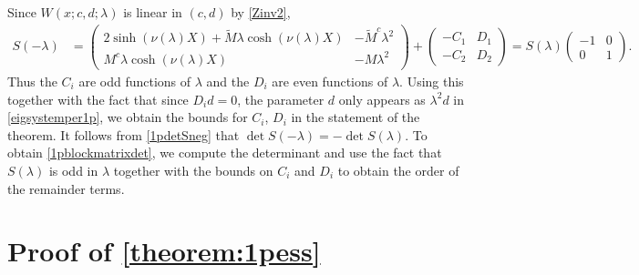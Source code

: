 \documentclass[thesis.tex]{subfiles}
\begin{document}
Since $W(x; c, d; \lambda)$ is linear in $(c, d)$ by \cref{Zinv2}, 
\begin{align}\label{1pdetSneg}
S(-\lambda) &= 
\begin{pmatrix}
2 \sinh(\nu(\lambda) X) + \tilde{M}\lambda \cosh(\nu(\lambda) X) & -\tilde{M}^c \lambda^2 \\
M^c \lambda \cosh(\nu(\lambda)X) & - M \lambda^2
\end{pmatrix} +
\begin{pmatrix}
-C_1 & D_1 \\ -C_2 & D_2
\end{pmatrix}
= S(\lambda)\begin{pmatrix}-1 & 0 \\ 0 & 1 \end{pmatrix}.
\end{align}
Thus the $C_i$ are odd functions of $\lambda$ and the $D_i$ are even functions of $\lambda$. Using this together with the fact that since $D_i d = 0$, the parameter $d$ only appears as $\lambda^2 d$ in \cref{eigsystemper1p}, we obtain the bounds for $C_i$, $D_i$ in the statement of the theorem. It follows from \cref{1pdetSneg} that $\det S(-\lambda) = -\det S(\lambda)$. To obtain \cref{1pblockmatrixdet}, we compute the determinant and use the fact that $S(\lambda)$ is odd in $\lambda$ together with the bounds on $C_i$ and $D_i$ to obtain the order of the remainder terms.

\section{Proof of \cref{theorem:1pess} }
\end{document}
